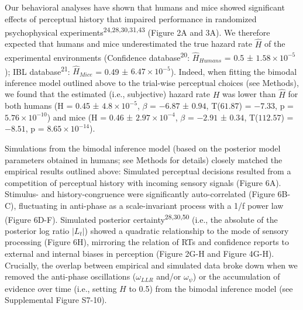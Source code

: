 \documentclass[
]{article}
\begin{document}
Our behavioral analyses have shown that humans and mice showed
significant effects of perceptual history that impaired performance in
randomized psychophysical experiments\textsuperscript{24,28,30,31,43}
(Figure 2A and 3A). We therefore expected that humans and mice
underestimated the true hazard rate \(\hat{H}\) of the experimental
environments (Confidence database\textsuperscript{20}:
\(\hat{H}_{Humans}\) = 0.5 ± \ensuremath{1.58\times 10^{-5}}); IBL
database\textsuperscript{21}: \(\hat{H}_{Mice}\) = 0.49 ±
\ensuremath{6.47\times 10^{-5}}). Indeed, when fitting the bimodal
inference model outlined above to the trial-wise perceptual choices (see
Methods), we found that the estimated (i.e., subjective) hazard rate
\(H\) was lower than \(\hat{H}\) for both humans (H = 0.45 ±
\ensuremath{4.8\times 10^{-5}}, \(\beta\) = \(-6.87\) ± \(0.94\),
T(\(61.87\)) = \(-7.33\), p = \(\ensuremath{5.76\times 10^{-10}}\)) and
mice (H = 0.46 ± \ensuremath{2.97\times 10^{-4}}, \(\beta\) = \(-2.91\)
± \(0.34\), T(\(112.57\)) = \(-8.51\), p =
\(\ensuremath{8.65\times 10^{-14}}\)).

Simulations from the bimodal inference model (based on the posterior
model parameters obtained in humans; see Methods for details) closely
matched the empirical results outlined above: Simulated perceptual
decisions resulted from a competition of perceptual history with
incoming sensory signals (Figure 6A). Stimulus- and history-congruence
were significantly auto-correlated (Figure 6B-C), fluctuating in
anti-phase as a scale-invariant process with a 1/f power law (Figure
6D-F). Simulated posterior certainty\textsuperscript{28,30,50} (i.e.,
the absolute of the posterior log ratio \(|L_t|\)) showed a quadratic
relationship to the mode of sensory processing (Figure 6H), mirroring
the relation of RTs and confidence reports to external and internal
biases in perception (Figure 2G-H and Figure 4G-H). Crucially, the
overlap between empirical and simulated data broke down when we removed
the anti-phase oscillations (\(\omega_{LLR}\) and/or \(\omega_{\psi}\))
or the accumulation of evidence over time (i.e., setting \(H\) to 0.5)
from the bimodal inference model (see Supplemental Figure S7-10).
\end{document}
